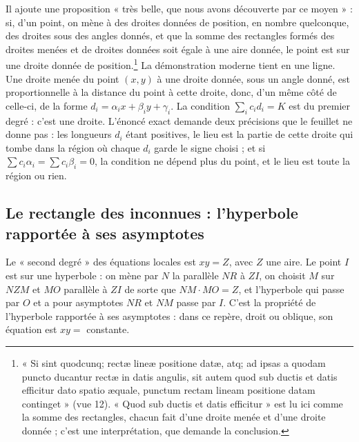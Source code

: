 \documentclass[11pt,a4paper]{article}
\begin{document}
Il ajoute une proposition « très belle, que nous avons découverte par ce
moyen » : si, d'un point, on mène à des droites données de position, en nombre
quelconque, des droites sous des angles donnés, et que la somme des rectangles
formés des droites menées et de droites données soit égale à une aire donnée,
le point est sur une droite donnée de position.\footnote{« Si sint quodcunq;
rectæ lineæ positione datæ, atq; ad ipsas a quodam puncto ducantur rectæ in
datis angulis, sit autem quod sub ductis et datis efficitur dato spatio æquale,
punctum rectam lineam positione datam continget » (vue 12). « Quod sub ductis
et datis efficitur » est lu ici comme la somme des rectangles, chacun fait
d'une droite menée et d'une droite donnée ; c'est une interprétation, que
demande la conclusion.} La démonstration moderne tient en une ligne. Une
droite menée du point $(x,y)$ à une droite donnée, sous un angle donné, est
proportionnelle à la distance du point à cette droite, donc, d'un même côté de
celle-ci, de la forme $d_i = \alpha_i x + \beta_i y + \gamma_i$. La condition
$\sum_i c_i d_i = K$ est du premier degré : c'est une droite. L'énoncé exact
demande deux précisions que le feuillet ne donne pas : les longueurs $d_i$
étant positives, le lieu est la partie de cette droite qui tombe dans la région
où chaque $d_i$ garde le signe choisi ; et si
$\sum c_i\alpha_i = \sum c_i\beta_i = 0$, la condition ne dépend plus du point,
et le lieu est toute la région ou rien.

\subsection*{Le rectangle des inconnues : l'hyperbole rapportée à ses asymptotes}

Le « second degré » des équations locales est $xy = Z$, avec $Z$ une aire. Le
point $I$ est sur une hyperbole : on mène par $N$ la parallèle $NR$ à $ZI$, on
choisit $M$ sur $NZM$ et $MO$ parallèle à $ZI$ de sorte que $NM\cdot MO = Z$, et
l'hyperbole qui passe par $O$ et a pour asymptotes $NR$ et $NM$ passe par $I$.
C'est la propriété de l'hyperbole rapportée à ses asymptotes : dans ce repère,
droit ou oblique, son équation est $xy = $ constante.
\end{document}
